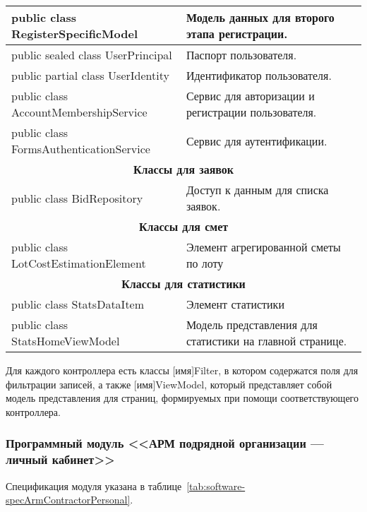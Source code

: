 \begin{myTable}
\begin{longtable}[h]{|p{}|p{}|}
	public class RegisterSpecificModel & Модель данных для второго этапа регистрации. \\ \hline
	public sealed class UserPrincipal & Паспорт пользователя. \\ \hline
	public partial class UserIdentity & Идентификатор пользователя. \\ \hline
	public class AccountMembershipService & Сервис для авторизации и регистрации пользователя. \\ \hline
	public class FormsAuthenticationService & Сервис для аутентификации. \\ \hline
	\multicolumn{2}{|c|}{\textbf{Классы для заявок}} \\ \hline
	public class BidRepository & Доступ к данным для списка заявок. \\ \hline
	\multicolumn{2}{|c|}{\textbf{Классы для смет}} \\ \hline
	public class LotCostEstimationElement & Элемент агрегированной сметы по лоту \\ \hline
	\multicolumn{2}{|c|}{\textbf{Классы для статистики}} \\ \hline
	public class StatsDataItem & Элемент статистики \\ \hline
	public class StatsHomeViewModel & Модель представления для статистики на главной странице. \\ \hline
\end{longtable}
\end{myTable}

Для каждого контроллера есть классы [имя]Filter, в котором содержатся поля для фильтрации записей, а также [имя]ViewModel, который представляет собой модель представления для страниц, формируемых при помощи соответствующего контроллера.

\subsubsection{Программный модуль <<АРМ подрядной организации --- личный кабинет>>}

Спецификация модуля указана в таблице~\ref{tab:software-specArmContractorPersonal}.

